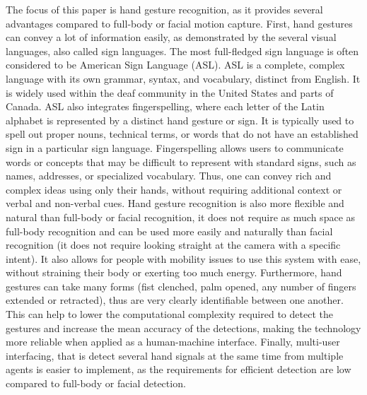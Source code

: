 \documentclass[12pt]{article}
\begin{document}
  The focus of this paper is hand gesture recognition, as it provides several advantages compared to full-body or facial motion capture. First, hand gestures can convey a lot of information easily, as demonstrated by the several visual languages, also called sign languages. The most full-fledged sign language is often considered to be American Sign Language (ASL). ASL is a complete, complex language with its own grammar, syntax, and vocabulary, distinct from English. It is widely used within the deaf community in the United States and parts of Canada.
  ASL also integrates fingerspelling, where each letter of the Latin alphabet is represented by a distinct hand gesture or sign. It is typically used to spell out proper nouns, technical terms, or words that do not have an established sign in a particular sign language. Fingerspelling allows users to communicate words or concepts that may be difficult to represent with standard signs, such as names, addresses, or specialized vocabulary. Thus, one can convey rich and complex ideas using only their hands, without requiring additional context or verbal and non-verbal cues.
  Hand gesture recognition is also more flexible and natural than full-body or facial recognition, it does not require as much space as full-body recognition and can be used more easily and naturally than facial recognition (it does not require looking straight at the camera with a specific intent). It also allows for people with mobility issues to use this system with ease, without straining their body or exerting too much energy.
  Furthermore, hand gestures can take many forms (fist clenched, palm opened, any number of fingers extended or retracted), thus are very clearly identifiable between one another. This can help to lower the computational complexity required to detect the gestures and increase the mean accuracy of the detections, making the technology more reliable when applied as a human-machine interface. Finally, multi-user interfacing, that is detect several hand signals at the same time from multiple agents is easier to implement, as the requirements for efficient detection are low compared to full-body or facial detection. 
\end{document}
